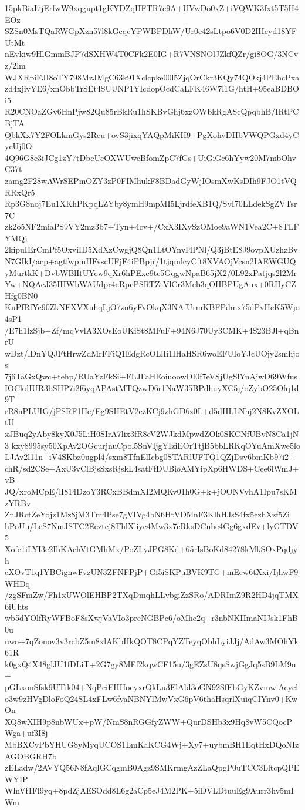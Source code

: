 15pkBiaI7jErfwW9xqgupt1gKYDZqHFTR7c9A+UVwDo0xZ+iVQWK3fxt5T5H4EOz
SZSn0MsTQaRWGpXzn57l8kGcqcYPWBPDhW/Ur0c42sLtpo6V0D2IHeyd18YFUtMt
nEvkiw9HlGmmBJP7dSXHW4T0CFk2E0IG+R7VNSNOlJZkfQZr/gi8OG/3NCvz/2lm
WJXRpiFJI8oTY798MzJMgC63k91Xclcpke00l5ZjqOrCkr3KQy74QOkj4PEhcPxa
zd4xjivYE6/xnObbTrSEt4SUUNP1YIcdopOcdCaLFK46W7l1G/htH+95eaBDBOi5
R20CNOaZGv6HnPjw82Qu85rBkRu1hSKBvGhj6xzOWbkRgAScQpqbhB/IRtPCBjTA
QbkXx7Y2FOLkmGys2Reu+ovS3jixqYAQpMiKH9+PgXohvDHbVWQPGxd4yCycUj0O
4Q96G8c3iJCg1zY7tDbcUcOXWUwcBfomZpC7fGs+UiGiGc6hYyw20M7mbOhvC37t
zamg2F28wAWrSEPmOZY3zP0FIMhukF8BDadGyWjIOsmXwKsDIh9FJO1tVQRRxQr5
Rp3G8noj7Eu1XKhPKpqLZYby8ymH9mpMI5LjrdfeXB1Q/SvI70LLdekSgZVTsr7C
zk2o5NF2miaPS9VY2mz3b7+Tyn+4cv+/CxX3IXySzOMoe9aWN1Vea2C+8TLFYMQj
2kipuIErCmPf5OxviID5XdXzCwgjQ8Qn1LtOYnvI4PNl/Q3jBtE8J9ovpXUzhzBv
N7GIkI/acp+agtfwpmHFvscUFjF4iPBpjr/1tjqmlcyCft8XVAOjVcsn2IAEWGUQ
yMurtkK+DvbWBlItUYew9qXr6hPExe9te5GqgwNpaB65jX2/0L92xPatjqs2l2Mr
Yw+NQAcJ35IHWbWAUdpr4cRpcPSRTZtVlCr3Mcb3qOHBPUgAux+0RHyCZHfg0BN0
KuPfRfYe90ZkNFXVXuhqLjO7zn6yFvOkqX3NAfUrmKBFPdmx75dPvHcK5Wjo4sP1
/E7h1lzSjb+Zf/mqVvlA3XOsEoUKiSt8MFuF+94N6J70Uy3CMK+4S23BJl+qBnrU
wDzt/lDnYQJFtHrwZdMrFFiQ1EdgRcOLlIi1IHaHSR6woEFUIoYJcUOjy2smhjos
7j6TaGxQwc+tehp/RUaYzFkSi+FLJFaHEoiuoowDI0f7eVSjUgSlYnAjwD69Wfus
IOCkdIUR3bSHP7i2f6yqAPAstMTQzwD6r1NaW35BPdhuyXC5j/oZybO25Ofq1d9T
rR8nPLUIG/jPSRF1IIe/Eg9SHEtV2ezKCj9zhGD6z0L+d5dHLLNhj2N8KvZXOLtU
xJBuq2yAby8kyX0J5LiH0SIrA7lix3fR8eV2WJkdMpwdZOk0SKCNfUBvN8Ca1jN3
kxy8995sy50XpAv2OGcurjnuCpol5SnVIjgYIziEOrTtjB5bbLRKqOYuAmXwe5lo
LJAv2l11n+iV4SKbz0ugpl4/sxm8TfnElIcbg0STARlUFTQ1QZjDsv6bmKb97i2+
chR/sd2CSe+AxU3vClBjsSxsRjskL4satFfDUBioAMYipXp6HWDS+Cee6lWmJ+vB
JQ/xroMCpE/lI814DzoY3RCxBBdmXI2MQKv01h0G+k+jOONVyhA1Ipu7sKMzYRBv
ZnJRctZeYojz1Mz8jM3Tm4Pse7gVIVg4bN6HtVD5InF3KlhHJsS4fx5ezhXzf5Zi
hPoUu/LeS7NmJSTC2Eeztcj8ThlXliyc4Mw3x7eRksDCuhe4Gg6gxdEv+lyGTDV5
Xofe1iLYI3c2IhKAchVtGMhMx/PoZLyJPG8Kd+65rIsBoKd84278kMkSOxPqdjyh
cXOvT1q1YBCignwFvzUN3ZFNFPjP+Gf5iSKPuBVK9TG+mEew6tXxi/IjhwF9WHDq
/zgSFmZw/Fh1xUWOlEHBP2TXqDmqhLLvbgiZzSRo/ADRImZ9R2HD4jqTMX6iUhts
wb5dYOlfRyWFBoF8sXwjVaVIo3preNGBPc6/oMhc2q+r3nbNKIImaNIJsk1FhB0u
nwo+7qZonov3v3rcbZ5m8xlAKbHkQOT8CPqYZTeyqObhLyiJJj/AdAw3MOhYk61R
k0gxQ4X48glJU1fDLiT+2G7gy8MFf2kqwCF15u/3gEZsU8qsSwjGgJq5sB9LM9u+
pGLxonSfsk9UTik04+NqPciFHHoeyxrQkLu3ElAld3oGN92SfFbGyKZvmwiAcycl
o3w9zHVgDloFoQ24SL4xFLw6fvaNBNYlMwVxG6pV6thaHsqrlXuiqCIYnv0+KwOn
XQ8wXIH9p8nbWUx+pW/NmS8nRGGfyZWW+QurDSHb3x9Hq8vW5CQocPWga+uf3I8j
MbBXCvPbYHUG8yMyqUCOS1LmKaKCG4Wj+Xy7+uybmBH1EqtHxDQoNIzAGOBGRH7b
zELadw/2AVYQ56N8fAqlGCqgmB0Agz9SMKrmgAzZLaQpgP0uTCC3LltcpQPEWYIP
WlnVf1Fl9yq+8pdZjAESOdd8L6g2aCp5eJ4M2PK+5iDVLDtuuEg9Aurr3hv5mIWm
